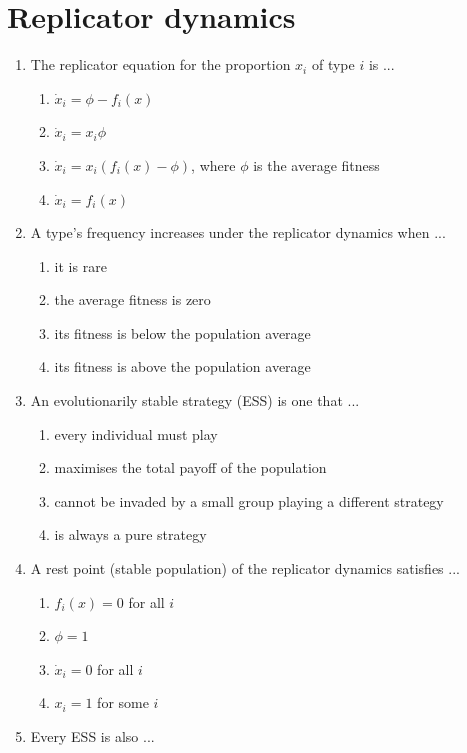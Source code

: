 \documentclass[11pt]{article}
\begin{document}
\section*{Replicator dynamics}
\begin{enumerate}[itemsep=6pt]
  \item The replicator equation for the proportion \(x_i\) of type \(i\) is ...
  \begin{enumerate}
    \item \(\dot{x}_i = \phi - f_i(x)\)
    \item \(\dot{x}_i = x_i \phi\)
    \item \(\dot{x}_i = x_i(f_i(x) - \phi)\), where \(\phi\) is the average fitness
    \item \(\dot{x}_i = f_i(x)\)
  \end{enumerate}
  \item A type's frequency increases under the replicator dynamics when ...
  \begin{enumerate}
    \item it is rare
    \item the average fitness is zero
    \item its fitness is below the population average
    \item its fitness is above the population average
  \end{enumerate}
  \item An evolutionarily stable strategy (ESS) is one that ...
  \begin{enumerate}
    \item every individual must play
    \item maximises the total payoff of the population
    \item cannot be invaded by a small group playing a different strategy
    \item is always a pure strategy
  \end{enumerate}
  \item A rest point (stable population) of the replicator dynamics satisfies ...
  \begin{enumerate}
    \item \(f_i(x) = 0\) for all \(i\)
    \item \(\phi = 1\)
    \item \(\dot{x}_i = 0\) for all \(i\)
    \item \(x_i = 1\) for some \(i\)
  \end{enumerate}
  \item Every ESS is also ...

\end{enumerate}
\end{document}
